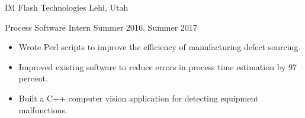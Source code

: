 \blockskip

\begin{tab1} IM Flash Technologies \> Lehi, Utah \end{tab1}

\begin{tab2} Process Software Intern \> Summer 2016, Summer 2017 \end{tab2}
\begin{itemize}
    \item Wrote Perl scripts to improve the efficiency of manufacturing defect sourcing.
    \item Improved existing software to reduce errors in process time estimation by 97 percent.
    \item Built a C++ computer vision application for detecting equipment malfunctions.
\end{itemize}

